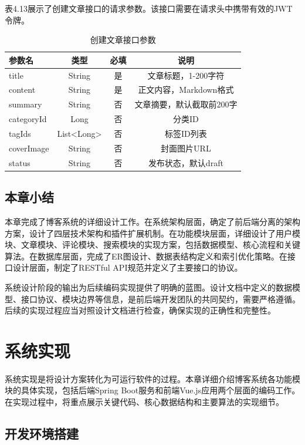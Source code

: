 \documentclass[UTF8,AutoFakeBold=1,AutoFakeSlant,zihao=-4]{SCAU}
\begin{document}
表4.13展示了创建文章接口的请求参数。该接口需要在请求头中携带有效的JWT令牌。

\begin{table}[H]
\centering
\caption{创建文章接口参数}
\label{tab:create-post-api}
\begin{tabular}{lccc}
\toprule
\textbf{参数名} & \textbf{类型} & \textbf{必填} & \textbf{说明} \\
\midrule
title & String & 是 & 文章标题，1-200字符 \\
content & String & 是 & 正文内容，Markdown格式 \\
summary & String & 否 & 文章摘要，默认截取前200字 \\
categoryId & Long & 否 & 分类ID \\
tagIds & List<Long> & 否 & 标签ID列表 \\
coverImage & String & 否 & 封面图片URL \\
status & String & 否 & 发布状态，默认draft \\
\bottomrule
\end{tabular}
\end{table}

 \subsection{本章小结}

 本章完成了博客系统的详细设计工作。在系统架构层面，确定了前后端分离的架构方案，设计了四层技术架构和插件扩展机制。在功能模块层面，详细设计了用户模块、文章模块、评论模块、搜索模块的实现方案，包括数据模型、核心流程和关键算法。在数据库层面，完成了ER图设计、数据表结构定义和索引优化策略。在接口设计层面，制定了RESTful API规范并定义了主要接口的协议。

 系统设计阶段的输出为后续编码实现提供了明确的蓝图。设计文档中定义的数据模型、接口协议、模块边界等信息，是前后端开发团队的共同契约，需要严格遵循。后续的实现过程应当对照设计文档进行检查，确保实现的正确性和完整性。

 \section{系统实现}

 系统实现是将设计方案转化为可运行软件的过程。本章详细介绍博客系统各功能模块的具体实现，包括后端Spring Boot服务和前端Vue.js应用两个层面的编码工作。在实现过程中，将重点展示关键代码、核心数据结构和主要算法的实现细节{\citep{罗涛2020}}。

 \subsection{开发环境搭建}
\end{document}
